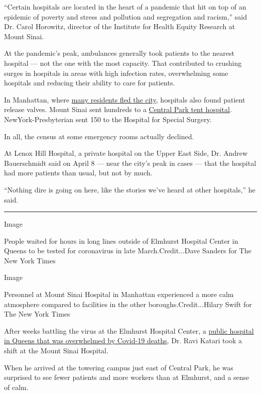 ``Certain hospitals are located in the heart of a pandemic that hit on
top of an epidemic of poverty and stress and pollution and segregation
and racism,'' said Dr. Carol Horowitz, director of the Institute for
Health Equity Research at Mount Sinai.

At the pandemic's peak, ambulances generally took patients to the
nearest hospital --- not the one with the most capacity. That
contributed to crushing surges in hospitals in areas with high infection
rates, overwhelming some hospitals and reducing their ability to care
for patients.

In Manhattan, where
\href{https://www.nytimes.com/interactive/2020/05/15/upshot/who-left-new-york-coronavirus.html}{many
residents fled the city}, hospitals also found patient release valves.
Mount Sinai sent hundreds to a
\href{https://www.nytimes.com/2020/04/15/nyregion/coronavirus-central-park-hospital-tent.html}{Central
Park tent hospital}. NewYork-Presbyterian sent 150 to the Hospital for
Special Surgery.

In all, the census at some emergency rooms actually declined.

At Lenox Hill Hospital, a private hospital on the Upper East Side, Dr.
Andrew Bauerschmidt said on April 8 --- near the city's peak in cases
--- that the hospital had more patients than usual, but not by much.

``Nothing dire is going on here, like the stories we've heard at other
hospitals,'' he said.

\begin{center}\rule{0.5\linewidth}{\linethickness}\end{center}

Image

People waited for hours in long lines outside of Elmhurst Hospital
Center in Queens to be tested for coronavirus in late
March.Credit...Dave Sanders for The New York Times

Image

Personnel at Mount Sinai Hospital in Manhattan experienced a more calm
atmosphere compared to facilities in the other boroughs.Credit...Hilary
Swift for The New York Times

After weeks battling the virus at the Elmhurst Hospital Center, a
\href{https://www.nytimes.com/2020/03/25/nyregion/nyc-coronavirus-hospitals.html}{public
hospital in Queens that was overwhelmed by Covid-19 deaths}, Dr. Ravi
Katari took a shift at the Mount Sinai Hospital.

When he arrived at the towering campus just east of Central Park, he was
surprised to see fewer patients and more workers than at Elmhurst, and a
sense of calm.

